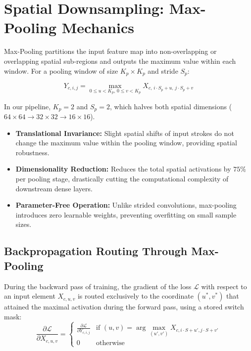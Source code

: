 \documentclass[11pt,a4paper,oneside]{report}
\begin{document}
\section{Spatial Downsampling: Max-Pooling Mechanics}
Max-Pooling partitions the input feature map into non-overlapping or overlapping spatial sub-regions and outputs the maximum value within each window. For a pooling window of size $K_p \times K_p$ and stride $S_p$:

\begin{equation}
    Y_{c, i, j} = \max_{0 \le u < K_p, \, 0 \le v < K_p} X_{c, \, i \cdot S_p + u, \, j \cdot S_p + v}
\end{equation}

In our pipeline, $K_p = 2$ and $S_p = 2$, which halves both spatial dimensions ($64 \times 64 \to 32 \times 32 \to 16 \times 16$).
\begin{itemize}
    \item \textbf{Translational Invariance:} Slight spatial shifts of input strokes do not change the maximum value within the pooling window, providing spatial robustness.
    \item \textbf{Dimensionality Reduction:} Reduces the total spatial activations by $75\%$ per pooling stage, drastically cutting the computational complexity of downstream dense layers.
    \item \textbf{Parameter-Free Operation:} Unlike strided convolutions, max-pooling introduces zero learnable weights, preventing overfitting on small sample sizes.
\end{itemize}

\subsection{Backpropagation Routing Through Max-Pooling}
During the backward pass of training, the gradient of the loss $\mathcal{L}$ with respect to an input element $X_{c, u, v}$ is routed exclusively to the coordinate $(u^*, v^*)$ that attained the maximal activation during the forward pass, using a stored switch mask:
\begin{equation}
    \frac{\partial \mathcal{L}}{\partial X_{c, u, v}} = \begin{cases} \frac{\partial \mathcal{L}}{\partial Y_{c, i, j}} & \text{if } (u, v) = \arg\max_{(u', v')} X_{c, i\cdot S + u', j\cdot S + v'} \\ 0 & \text{otherwise} \end{cases}
\end{equation}
\end{document}
